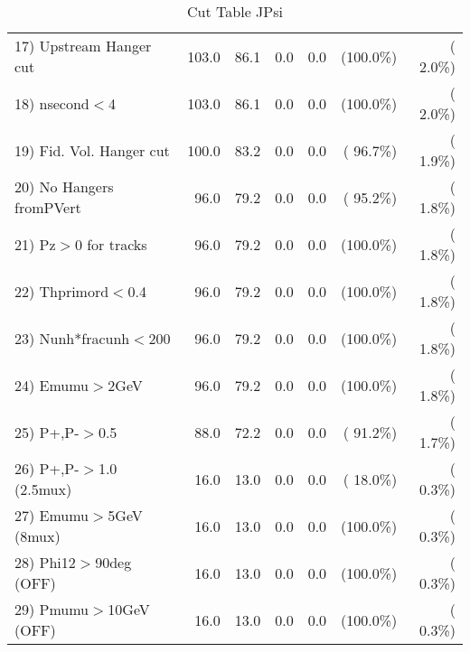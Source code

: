 \begin{table}[h!]
\begin{tabular}{||l||r|r|r|r|r|r||}
 17) Upstream Hanger cut  &        103.0 &         86.1 &          0.0 &          0.0 & (100.0\%) & (  2.0\%) \\
 18) nsecond$<$4          &        103.0 &         86.1 &          0.0 &          0.0 & (100.0\%) & (  2.0\%) \\
 19) Fid. Vol. Hanger cut &        100.0 &         83.2 &          0.0 &          0.0 & ( 96.7\%) & (  1.9\%) \\
 20) No Hangers fromPVert &         96.0 &         79.2 &          0.0 &          0.0 & ( 95.2\%) & (  1.8\%) \\
 21) Pz$>$0 for tracks    &         96.0 &         79.2 &          0.0 &          0.0 & (100.0\%) & (  1.8\%) \\
 22) Thprimord$<$0.4      &         96.0 &         79.2 &          0.0 &          0.0 & (100.0\%) & (  1.8\%) \\
 23) Nunh*fracunh$<$200   &         96.0 &         79.2 &          0.0 &          0.0 & (100.0\%) & (  1.8\%) \\
 24) Emumu$>$2GeV         &         96.0 &         79.2 &          0.0 &          0.0 & (100.0\%) & (  1.8\%) \\
 25) P+,P-$>$0.5          &         88.0 &         72.2 &          0.0 &          0.0 & ( 91.2\%) & (  1.7\%) \\
 26) P+,P-$>$1.0 (2.5mux) &         16.0 &         13.0 &          0.0 &          0.0 & ( 18.0\%) & (  0.3\%) \\
 27) Emumu$>$5GeV  (8mux) &         16.0 &         13.0 &          0.0 &          0.0 & (100.0\%) & (  0.3\%) \\
 28) Phi12$>$90deg  (OFF) &         16.0 &         13.0 &          0.0 &          0.0 & (100.0\%) & (  0.3\%) \\
 29) Pmumu$>$10GeV  (OFF) &         16.0 &         13.0 &          0.0 &          0.0 & (100.0\%) & (  0.3\%) \\
 \hline
 \hline
 \end{tabular}
 \caption{Cut Table  JPsi     }
 \label{tab-cutcohjpsi-mumu_jpsi}
 \end{table}
